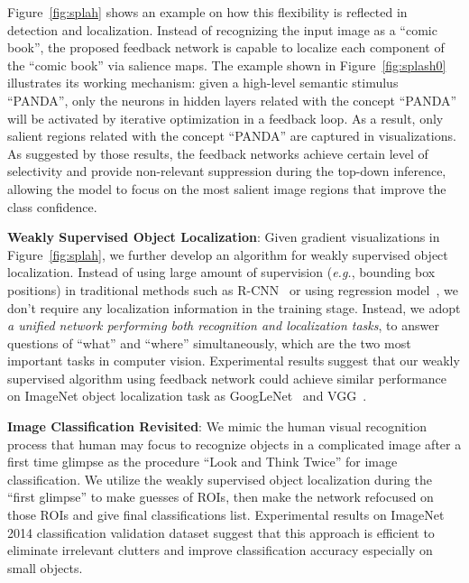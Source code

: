 Figure~\ref{fig:splah} shows an example on how this flexibility is reflected in detection and localization. Instead of recognizing the input image as a ``comic book'', the proposed feedback network is capable to localize each component of the ``comic book'' via salience maps. The example shown in Figure~\ref{fig:splash0} illustrates its working mechanism: given a high-level semantic stimulus ``PANDA'', only the neurons in hidden layers related with the concept ``PANDA'' will be activated by iterative optimization in a feedback loop. As a result, only salient regions related with the concept ``PANDA'' are captured in visualizations.
As suggested by those results, the feedback networks achieve certain level of selectivity and provide non-relevant suppression during the top-down inference, allowing the model to focus on the most salient image regions that improve the class confidence.

\textbf{Weakly Supervised Object Localization}:
Given gradient visualizations in Figure~\ref{fig:splah}, we further develop an algorithm for weakly supervised object localization. Instead of using large amount of supervision (\emph{e.g.}, bounding box positions) in traditional methods such as R-CNN~\cite{girshick2014rich} or using regression model~\cite{erhan2014scalable, Simonyan2014Very}, we don't require any localization information in the training stage. Instead, we adopt \emph{a unified network performing both recognition and localization tasks}, to answer questions of ``what'' and ``where'' simultaneously, which are the two most important tasks in computer vision. Experimental results suggest that our weakly supervised algorithm using feedback network could achieve similar performance on ImageNet object localization task as GoogLeNet~\cite{Szegedy2014Going} and VGG~\cite{Simonyan2014Very}.

\textbf{Image Classification Revisited}:
We mimic the human visual recognition process that human may focus to recognize objects in a complicated image after a first time glimpse as the procedure ``Look and Think Twice'' for image classification. We utilize the weakly supervised object localization during the ``first glimpse'' to make guesses of ROIs, then make the network refocused on those ROIs and give final classifications list. Experimental results on ImageNet 2014 classification validation dataset suggest that this approach is efficient to eliminate irrelevant clutters and improve classification accuracy especially on small objects.


